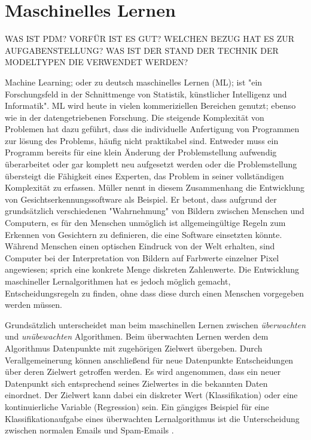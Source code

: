 \chapter{Maschinelles Lernen}
\label{ch:maschinelles lernen}
WAS IST PDM? VORFÜR IST ES GUT? WELCHEN BEZUG HAT ES ZUR AUFGABENSTELLUNG? WAS IST DER STAND DER TECHNIK DER MODELTYPEN DIE VERWENDET WERDEN?

Machine Learning; oder zu deutsch maschinelles Lernen (ML); ist "ein Forschungsfeld in der Schnittmenge von Statistik, künstlicher Intelligenz und Informatik"\cite[S.~1]{Muller.2017}. ML wird heute in vielen kommeriziellen Bereichen genutzt; ebenso wie in der datengetriebenen Forschung. Die steigende Komplexität von Problemen hat dazu geführt, dass die individuelle Anfertigung von Programmen zur lösung des Problems, häufig nicht praktikabel sind. Entweder muss ein Programm bereits für eine klein Änderung der Problemstellung aufwendig überarbeitet oder gar komplett neu aufgesetzt werden oder die Problemstellung übersteigt die Fähigkeit eines Experten, das Problem in seiner vollständigen Komplexität zu erfassen. Müller \cite{Muller.2017} nennt in diesem Zusammenhang die Entwicklung von Gesichtserkennungssoftware als Beispiel. Er betont, dass aufgrund der grundsätzlich verschiedenen "Wahrnehmung" von Bildern zwischen Menschen und Computern, es für den Menschen unmöglich ist allgemeingültige Regeln zum Erkennen von Gesichtern zu definieren, die eine Software einsetzten könnte. Während Menschen einen optischen Eindruck von der Welt erhalten, sind Computer bei der Interpretation von Bildern auf Farbwerte einzelner Pixel angewiesen; sprich eine konkrete Menge diskreten Zahlenwerte. Die Entwicklung maschineller Lernalgorithmen hat es jedoch möglich gemacht, Entscheidungsregeln zu finden, ohne dass diese durch einen Menschen vorgegeben werden müssen.

Grundsätzlich unterscheidet man beim maschinellen Lernen zwischen \textit{überwachten} und \textit{unübewachten} Algorithmen. Beim überwachten Lernen werden dem Algorithmus Datenpunkte mit zugehörigen Zielwert übergeben. Durch Verallgemeinerung können anschließend für neue Datenpunkte Entscheidungen über deren Zielwert getroffen werden. Es wird angenommen, dass ein neuer Datenpunkt sich entsprechend seines Zielwertes in die bekannten Daten einordnet. Der Zielwert kann dabei ein diskreter Wert (Klassifikation) oder eine kontinuierliche Variable (Regression) sein. Ein gängiges Beispiel für eine Klassifikationaufgabe eines überwachten Lernalgorithmus ist die Unterscheidung zwischen normalen Emails und Spam-Emails \cite[S.~2]{Muller.2017}.

